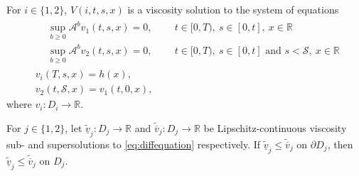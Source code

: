 \documentclass[10pt,a4paper]{amsart}
\begin{document}
\begin{thm}
    For $i \in \{1,2\}$, $V(i,t,s,x)$ is a viscosity solution to the system of equations
    \begin{align}
        &\begin{aligned}
        &\sup_{b\geq 0} \mathcal{A}^b v_1(t,s,x)=0,\ \qquad  t \in [0,T),\ s\in [0,t],\ x \in \mathbb{R}\label{eq:diffequation}\\&\sup_{b\geq 0} \mathcal{A}^b v_2(t,s,x)=0,\ \qquad t \in [0,T),\ s\in [0,t] \text{ and } s<\mathcal{S}, \ x \in \mathbb{R} 
        \end{aligned}\\
        &v_i(T,s,x)=h(x),\\
        &v_2(t,\mathcal{S},x)=v_1(t,0,x),
    \end{align}
    where $v_i: D_i \rightarrow \mathbb{R}$.
\end{thm}

\begin{thm}
    For $j \in \{1,2\}$, let $\tilde{\underline{v}}_j:D_j\to\mathbb{R}$ and $\tilde{\overline{v}}_j:D_j\to\mathbb{R}$ be Lipschitz-continuous viscosity sub- and supersolutions to \eqref{eq:diffequation} respectively. If $\tilde{\underline{v}}_j\leq\tilde{\overline{v}}_j$ on $\partial D_j$, then $\tilde{\underline{v}}_j\leq \tilde{\overline{v}}_j$ on $D_j$. 
\end{thm}
\end{document}
